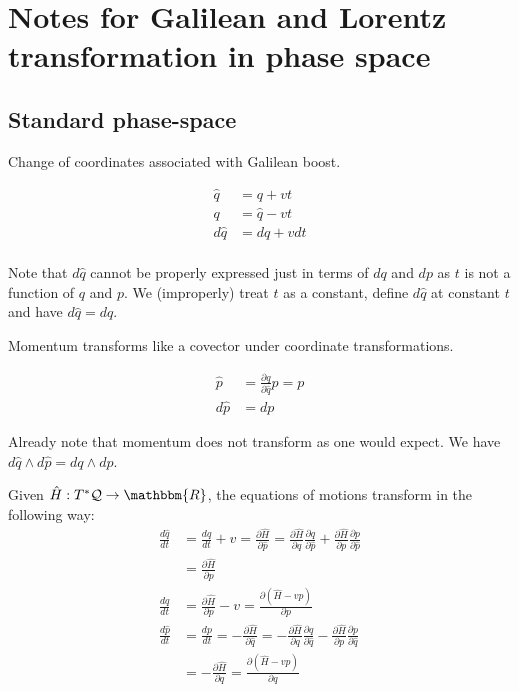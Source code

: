 \documentclass[aps,pra,10pt,twocolumn,floatfix,nofootinbib]{revtex4-1}
\theoremstyle{definition}
\begin{document}
\section{Notes for Galilean and Lorentz transformation in phase space}

\subsection{Standard phase-space}

Change of coordinates associated with Galilean boost.

\begin{align*}
\hat{q} &= q + vt \\
q &= \hat{q} - vt \\
d\hat{q} &= dq + v dt \\
\end{align*}

Note that $d\hat{q}$ cannot be properly expressed just in terms of $dq$ and $dp$ as $t$ is not a function of $q$ and $p$. We (improperly) treat $t$ as a constant, define $d\hat{q}$ at constant $t$ and have $d\hat{q} = dq$.

Momentum transforms like a covector under coordinate transformations.

\begin{align*}
\hat{p} &= \frac{\partial q}{\partial \hat{q}} p = p \\
d \hat{p} &= dp
\end{align*}

Already note that momentum does not transform as one would expect. We have $d\hat{q} \wedge d\hat{p} = dq \wedge dp$.

Given $\hat{H} : T^*\mathcal{Q} \rightarrow \mathbbm{R}$, the equations of motions transform in the following way:
\begin{align*}
\frac{d\hat{q}}{dt} &= \frac{dq}{dt} + v = \frac{\partial \hat{H}}{\partial \hat{p}}= \frac{\partial \hat{H}}{\partial q} \frac{\partial q}{\partial \hat{p}} + \frac{\partial \hat{H}}{\partial p} \frac{\partial p}{\partial \hat{p}} \\
&= \frac{\partial \hat{H}}{\partial p} \\
\frac{dq}{dt} &= \frac{\partial \hat{H}}{\partial p} - v = \frac{\partial (\hat{H} - vp)}{\partial p} \\
\frac{d\hat{p}}{dt} &= \frac{dp}{dt} = - \frac{\partial \hat{H}}{\partial \hat{q}} = - \frac{\partial \hat{H}}{\partial q} \frac{\partial q}{\partial \hat{q}} - \frac{\partial \hat{H}}{\partial p} \frac{\partial p}{\partial \hat{q}} \\
&=  - \frac{\partial \hat{H}}{\partial q} = \frac{\partial (\hat{H} - vp)}{\partial q}
\end{align*}
\end{document}
